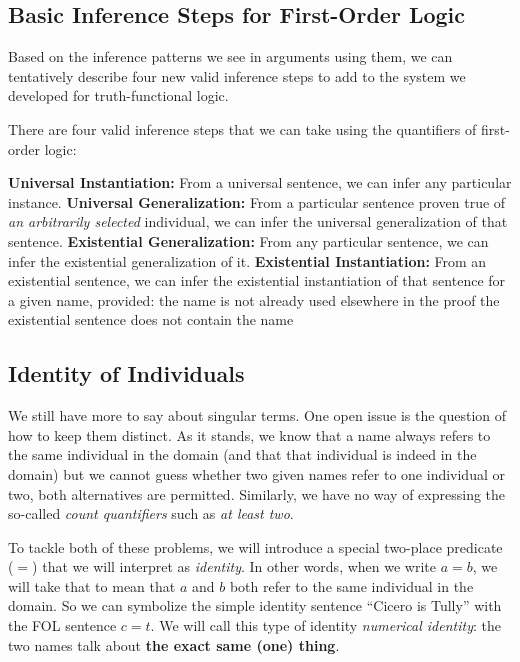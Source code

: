 \subsection{Basic Inference Steps for First-Order Logic}

Based on the inference patterns we see in arguments using them, we can
tentatively describe four new valid inference steps to add to the system
we developed for truth-functional logic.

\begin{observation}
  There are four valid inference steps that we can take using the quantifiers
  of first-order logic:
  \begin{outline}[enumerate]
  \1 \textbf{Universal Instantiation:} From a universal sentence, we can
  infer any particular instance.
  \1 \textbf{Universal Generalization:} From a particular sentence proven
  true of \emph{an arbitrarily selected} individual, we can infer the
  universal generalization of that sentence.
  \1 \textbf{Existential Generalization:} From any particular sentence, we can
  infer the existential generalization of it.
  \1 \textbf{Existential Instantiation:} From an existential sentence, we can
  infer the existential instantiation of that sentence for a given name,
  provided:
  \2 the name is not already used elsewhere in the proof
  \2 the existential sentence does not contain the name
  \end{outline}
\end{observation}

\subsection{Identity of Individuals}


We still have more to say about singular terms. One open issue is the question
of how to keep them distinct. As it stands, we know that a name always refers
to the same individual in the domain (and that that individual is indeed in the
domain) but we cannot guess whether two given names refer to one individual or
two, both alternatives are permitted. Similarly, we have no way of expressing
the so-called \emph{count quantifiers} such as \emph{at least two}.

To tackle both of these problems, we will introduce a special two-place
predicate ($=$) that we will interpret as \emph{identity}. In other words,
when we write $a=b$, we will take that to mean that $a$ and $b$ both refer to
the same individual in the domain. So we can symbolize the simple identity
sentence ``Cicero is Tully'' with the FOL sentence $c=t$. We will call this type
of identity \emph{numerical identity}: the two names talk about
\textbf{the exact same (one) thing}.

